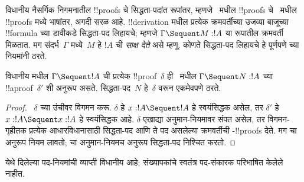 \documentclass[../../../include/open-logic-section]{subfiles}
\begin{document}


विधानीय नैसर्गिक निगमनातील !!{proof}s चे सिद्धता-पदांत रूपांतर,
म्हणजे~ मधील !!{proof}s चे~
मधील !!{proof}s मध्ये भाषांतर, अगदी सरळ आहे.
!!{derivation} मधील प्रत्येक क्रमवर्तीच्या उजव्या
बाजूच्या !!{formula} च्या डावीकडे सिद्धता-पद लिहायचे;
म्हणजे $\Gamma \Sequent M : !A$ या रूपातील
क्रमवर्ती मिळतात. मग संदर्भ~$\Gamma$ मध्ये~$M$ हे
$!A$ ची \emph{साक्ष देते} असे म्हणू. कोणते सिद्धता-पद
लिहायचे हे पूर्णपणे  च्या नियमांनी ठरते.

\begin{prop}
विधानीय  मधील $\Gamma \Sequent !A$ ची प्रत्येक
!!{proof}~$\delta$ ही~ मधील
$\Gamma \Sequent N : !A$ च्या !!a{proof}~$\delta'$ शी
अनुरूप असते. सिद्धता-पद~$N$ हे~$\delta$ वरून
एकमेवपणे ठरते.
\end{prop}

\begin{proof}
~$\delta$ च्या उंचीवर विगमन करू. $\delta$ हे
$x:!A \Sequent !A$ हे स्वयंसिद्धक असेल, तर
$\delta'$ हे~$x:!A \Sequent x:!A$ हे स्वयंसिद्धक आहे.
$\delta$ एखाद्या अनुमान-नियमावर संपत असेल, तर
विगमन-गृहीतक प्रत्येक आधारविधानासाठी सिद्धता-पद आणि
ते पद असलेल्या क्रमवर्तीची -!!{proof}s देते.
मग  चा अनुरूप नियम लावतो;
 चा अनुमान-नियमच अनुरूप सिद्धता-पद निश्चित करतो.
\end{proof}
येथे दिलेल्या पद-नियमांची व्याप्ती विधानीय आहे;
संख्यापकांचे स्वतंत्र पद-संकारक परिभाषित केलेले नाहीत.
\end{document}
